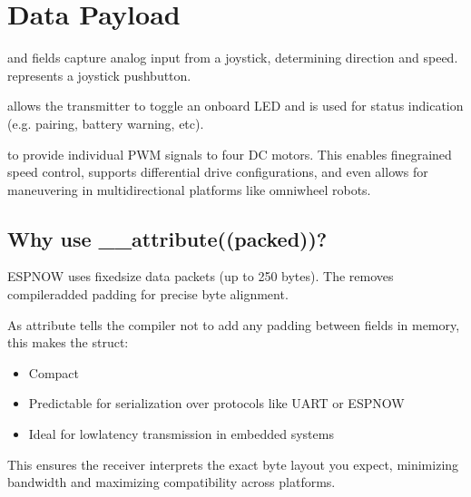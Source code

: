 \documentclass[letterpaper,10pt,english]{sphinxmanual}
\begin{document}
\section{Data Payload}
\label{\detokenize{data:data-payload}}
\sphinxAtStartPar
{} and  fields capture analog input from a joystick, determining direction and speed.
 represents a joystick push\sphinxhyphen{}button.

\sphinxAtStartPar
{} allows the transmitter to toggle an onboard LED and is used for status indication (e.g. pairing, battery warning, etc).

\sphinxAtStartPar
{} to  provide individual PWM signals to four DC motors.
This enables fine\sphinxhyphen{}grained speed control, supports differential drive configurations, and even allows for maneuvering in multi\sphinxhyphen{}directional platforms like omni\sphinxhyphen{}wheel robots.


\subsection{Why use \_\_attribute((packed))?}
\label{\detokenize{data:why-use-attribute-packed}}
\sphinxAtStartPar
ESP\sphinxhyphen{}NOW uses fixed\sphinxhyphen{}size data packets (up to 250 bytes). The  removes compiler\sphinxhyphen{}added padding for precise byte alignment.

\sphinxAtStartPar
As  attribute tells the compiler not to add any padding between fields in memory, this makes the struct:
\begin{itemize}
\item {} 
\sphinxAtStartPar
Compact

\item {} 
\sphinxAtStartPar
Predictable for serialization over protocols like UART or ESP\sphinxhyphen{}NOW

\item {} 
\sphinxAtStartPar
Ideal for low\sphinxhyphen{}latency transmission in embedded systems

\end{itemize}

\sphinxAtStartPar
This ensures the receiver interprets the exact byte layout you expect, minimizing bandwidth and maximizing compatibility across platforms.
\end{document}
